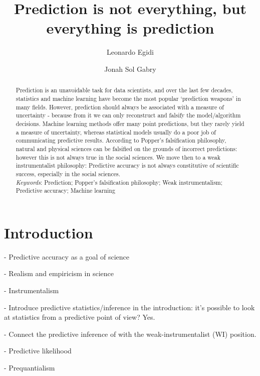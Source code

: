 \documentclass{statsoc}
\title[]{Prediction is not everything, but everything is prediction}
\author[Egidi and Gabry]{Leonardo Egidi}
\author[Egidi and Gabry]{Jonah Sol Gabry}
\begin{document}
\maketitle

\begin{abstract}
Prediction is an unavoidable task for data scientists, and over the last few decades, statistics and machine learning have become the most popular `prediction weapons' in many fields. However, prediction should always be associated with a measure of uncertainty - because from it  we can only reconstruct and 
falsify the model/algorithm decisions. Machine learning methods offer many point predictions,  but they rarely yield a measure of uncertainty, whereas statistical 
models usually do a poor job of communicating predictive results.
According to Popper’s falsification philosophy, natural and physical sciences can be falsified on the grounds of incorrect predictions: however  this is not always true in the social sciences.
We move then to a weak instrumentalist philosophy: Predictive accuracy is not always constitutive of scientific success, especially in the social sciences.\\

\emph{Keywords}: Prediction; Popper’s falsification philosophy; Weak instrumentalism; Predictive accuracy; Machine learning

\end{abstract}

\section{Introduction}

\color{blue}
- Predictive accuracy as a goal of science \citep{forster2002predictive}

- Realism and empiricism in science \citep{sober2002instrumentalism}

- Instrumentalism \citep{hitchcock2004prediction, sober2002instrumentalism}

- Introduce predictive statistics/inference in the introduction: it's possible to look at statistics from a predictive point of view? Yes.

- Connect the predictive inference of \cite{billheimer2019predictive} with the weak-instrumentalist (WI) position. 

- Predictive likelihood \citep{bjornstad1990predictive, geisser2017predictive, billheimer2019predictive}

- Prequantialism \citep{dawid1984present}
\color{black}
\end{document}
